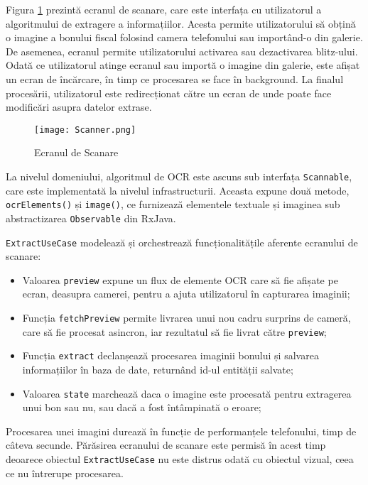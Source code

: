 Figura \ref{fig:scanner} prezintă ecranul de scanare, care este interfața cu utilizatorul a algoritmului de extragere a informațiilor. Acesta permite utilizatorului să obțină o imagine a bonului fiscal folosind camera telefonului sau importând-o din galerie. De asemenea, ecranul permite utilizatorului activarea sau dezactivarea blitz-ului. Odată ce utilizatorul atinge ecranul sau importă o imagine din galerie, este afișat un ecran de încărcare, în timp ce procesarea se face în background. La finalul procesării, utilizatorul este redirecționat către un ecran de unde poate face modificări asupra datelor extrase.

\begin{figure}[ht]
  \centering
  \texttt{[image: Scanner.png]}
  \caption{Ecranul de Scanare}
  \label{fig:scanner}
\end{figure}

La nivelul domeniului, algoritmul de OCR este ascuns sub interfața \texttt{Scannable}, care este implementată la nivelul infrastructurii. Aceasta expune două metode, \texttt{ocrElements()} și \texttt{image()}, ce furnizează elementele textuale și imaginea sub abstractizarea \texttt{Observable} din RxJava.



\texttt{ExtractUseCase} modelează și orchestrează funcționalitățile aferente ecranului de scanare:

\begin{itemize}
  \item 
  Valoarea \texttt{preview} expune un flux de elemente OCR care să fie afișate pe ecran, deasupra camerei, pentru a ajuta utilizatorul în capturarea imaginii;

  \item
  Funcția \texttt{fetchPreview} permite livrarea unui nou cadru surprins de cameră, care să fie procesat asincron, iar rezultatul să fie livrat către \texttt{preview};

  \item
  Funcția \texttt{extract} declanșează procesarea imaginii bonului și salvarea informațiilor în baza de date, returnând id-ul entității salvate;

  \item
  Valoarea \texttt{state} marchează daca o imagine este procesată pentru extragerea unui bon sau nu, sau dacă a fost întâmpinată o eroare;
\end{itemize}

Procesarea unei imagini durează în funcție de performanțele telefonului, timp de câteva secunde. Părăsirea ecranului de scanare este permisă în acest timp deoarece obiectul \texttt{ExtractUseCase} nu este distrus odată cu obiectul vizual, ceea ce nu întrerupe procesarea.
